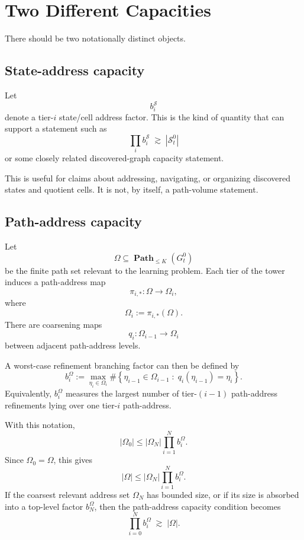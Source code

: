 \documentclass[11pt]{article}
\newcommand{\Path}{\operatorname{\mathbf{Path}}}
\begin{document}
\section*{Two Different Capacities}

There should be two notationally distinct objects.

\subsection*{State-address capacity}

Let
\[
    b_i^{\mathcal S}
\]
denote a tier-\(i\) state/cell address factor.  This is the kind of quantity that can support a statement such as
\[
    \prod_i b_i^{\mathcal S}
    \;\gtrsim\;
    |\mathcal S_t^0|
\]
or some closely related discovered-graph capacity statement.

This is useful for claims about addressing, navigating, or organizing discovered states and quotient cells.  It is not, by itself, a path-volume statement.

\subsection*{Path-address capacity}

Let
\[
    \Omega\subseteq \Path_{\le K}(G_t^0)
\]
be the finite path set relevant to the learning problem.  Each tier of the tower induces a path-address map
\[
    \pi_{i,*}:\Omega\longrightarrow \Omega_i,
\]
where
\[
    \Omega_i:=\pi_{i,*}(\Omega).
\]
There are coarsening maps
\[
    q_i:\Omega_{i-1}\longrightarrow \Omega_i
\]
between adjacent path-address levels.

A worst-case refinement branching factor can then be defined by
\[
    b_i^\Omega
    :=
    \max_{\eta_i\in\Omega_i}
    \#\left\{
        \eta_{i-1}\in\Omega_{i-1}
        \;:\;
        q_i(\eta_{i-1})=\eta_i
    \right\}.
\]
Equivalently, \(b_i^\Omega\) measures the largest number of tier-\((i-1)\) path-address refinements lying over one tier-\(i\) path-address.

With this notation,
\[
    |\Omega_0|
    \le
    |\Omega_N|\prod_{i=1}^{N}b_i^\Omega.
\]
Since \(\Omega_0=\Omega\), this gives
\[
    |\Omega|
    \le
    |\Omega_N|\prod_{i=1}^{N}b_i^\Omega.
\]
If the coarsest relevant address set \(\Omega_N\) has bounded size, or if its size is absorbed into a top-level factor \(b_N^\Omega\), then the path-address capacity condition becomes
\[
    \prod_{i=0}^{N}b_i^\Omega
    \;\gtrsim\;
    |\Omega|.
\]
\end{document}

